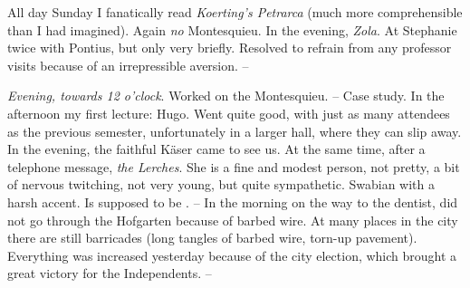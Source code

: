 
All day Sunday I fanatically read \textit{Koerting's Petrarca} (much more comprehensible than I had imagined). Again \textit{no} Montesquieu. In the evening, \textit{Zola}. At Stephanie twice with Pontius, but only very briefly. Resolved to refrain from any professor visits because of an irrepressible aversion. --

\textit{Evening, towards 12 o'clock}. Worked on the Montesquieu. -- Case study. In the afternoon my first lecture: Hugo. Went quite good, with just as many attendees as the previous semester, unfortunately in a larger hall, where they can slip away. In the evening, the faithful Käser came to see us. At the same time, after a telephone message, \textit{the Lerches}. She is a fine and modest person, not pretty, a bit of nervous twitching, not very young, but quite sympathetic. Swabian with a harsh accent. Is supposed to be . -- In the morning on the way to the dentist, did not go through the Hofgarten because of barbed wire. At many places in the city there are still barricades (long tangles of barbed wire, torn-up pavement). Everything was increased yesterday because of the city election, which brought a great victory for the Independents. --

\missing



%